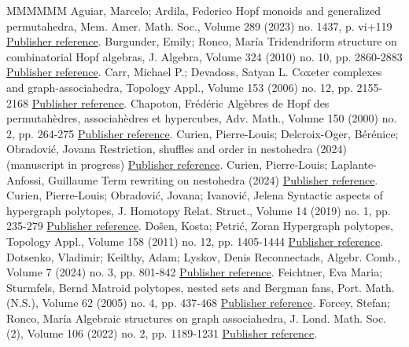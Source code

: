 \documentclass[11pt]{article}
\theoremstyle{definition}
\numberwithin{equation}{section}
\numberwithin{equation}{section}
\begin{document}
\begin{thebibliography}{MMMMMM}
 Aguiar, Marcelo; Ardila, Federico Hopf monoids and generalized permutahedra, Mem. Amer. Math. Soc., Volume 289 (2023) no. 1437, p. vi+119 \href{https://alco.centre-mersenne.org/articles/10.5802/alco.401/#AguiarArdila}{Publisher reference}.
 Burgunder, Emily; Ronco, María Tridendriform structure on combinatorial Hopf algebras, J. Algebra, Volume 324 (2010) no. 10, pp. 2860-2883 \href{https://alco.centre-mersenne.org/articles/10.5802/alco.401/#BR}{Publisher reference}.
 Carr, Michael P.; Devadoss, Satyan L. Coxeter complexes and graph-associahedra, Topology Appl., Volume 153 (2006) no. 12, pp. 2155-2168 \href{https://alco.centre-mersenne.org/articles/10.5802/alco.401/#CD-CCGA}{Publisher reference}.
 Chapoton, Frédéric Algèbres de Hopf des permutahèdres, associahèdres et hypercubes, Adv. Math., Volume 150 (2000) no. 2, pp. 264-275 \href{https://alco.centre-mersenne.org/articles/10.5802/alco.401/#Ch00}{Publisher reference}.
 Curien, Pierre-Louis; Delcroix-Oger, Bérénice; Obradović, Jovana Restriction, shuffles and order in nestohedra (2024) (manuscript in progress) \href{https://alco.centre-mersenne.org/articles/10.5802/alco.401/#RSON}{Publisher reference}.
 Curien, Pierre-Louis; Laplante-Anfossi, Guillaume Term rewriting on nestohedra (2024) \href{https://alco.centre-mersenne.org/articles/10.5802/alco.401/#CLA24}{Publisher reference}.
 Curien, Pierre-Louis; Obradović, Jovana; Ivanović, Jelena Syntactic aspects of hypergraph polytopes, J. Homotopy Relat. Struct., Volume 14 (2019) no. 1, pp. 235-279 \href{https://alco.centre-mersenne.org/articles/10.5802/alco.401/#COI}{Publisher reference}.
 Došen, Kosta; Petrić, Zoran Hypergraph polytopes, Topology Appl., Volume 158 (2011) no. 12, pp. 1405-1444 \href{https://alco.centre-mersenne.org/articles/10.5802/alco.401/#DP}{Publisher reference}.
 Dotsenko, Vladimir; Keilthy, Adam; Lyskov, Denis Reconnectads, Algebr. Comb., Volume 7 (2024) no. 3, pp. 801-842 \href{https://alco.centre-mersenne.org/articles/10.5802/alco.401/#DotsenkoReconnectad}{Publisher reference}.
 Feichtner, Eva Maria; Sturmfels, Bernd Matroid polytopes, nested sets and Bergman fans, Port. Math. (N.S.), Volume 62 (2005) no. 4, pp. 437-468 \href{https://alco.centre-mersenne.org/articles/10.5802/alco.401/#FS05}{Publisher reference}.
 Forcey, Stefan; Ronco, María Algebraic structures on graph associahedra, J. Lond. Math. Soc. (2), Volume 106 (2022) no. 2, pp. 1189-1231 \href{https://alco.centre-mersenne.org/articles/10.5802/alco.401/#FR}{Publisher reference}.

\end{thebibliography}
\end{document}
